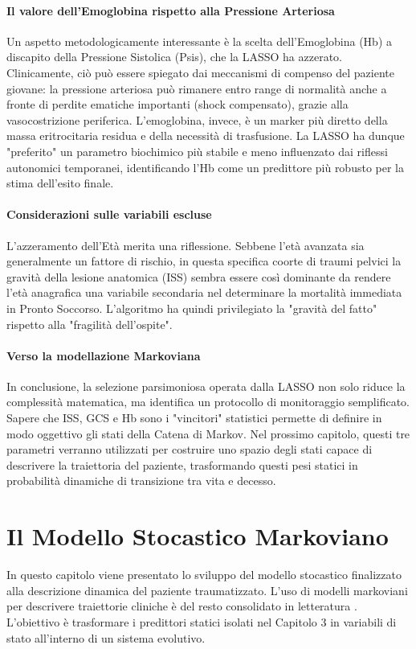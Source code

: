 \documentclass[11pt, oneside, noexaminfo]{sapthesis}   	%
\begin{document}
\subsubsection{Il valore dell'Emoglobina rispetto alla Pressione Arteriosa}
Un aspetto metodologicamente interessante è la scelta dell'Emoglobina (Hb) a discapito della Pressione Sistolica (Psis), che la LASSO ha azzerato. Clinicamente, ciò può essere spiegato dai meccanismi di compenso del paziente giovane: la pressione arteriosa può rimanere entro range di normalità anche a fronte di perdite ematiche importanti (shock compensato), grazie alla vasocostrizione periferica. L'emoglobina, invece, è un marker più diretto della massa eritrocitaria residua e della necessità di trasfusione. La LASSO ha dunque "preferito" un parametro biochimico più stabile e meno influenzato dai riflessi autonomici temporanei, identificando l'Hb come un predittore più robusto per la stima dell'esito finale.

\subsubsection{Considerazioni sulle variabili escluse}
L'azzeramento dell'Età merita una riflessione. Sebbene l'età avanzata sia generalmente un fattore di rischio, in questa specifica coorte di traumi pelvici la gravità della lesione anatomica (ISS) sembra essere così dominante da rendere l'età anagrafica una variabile secondaria nel determinare la mortalità immediata in Pronto Soccorso. L'algoritmo ha quindi privilegiato la "gravità del fatto" rispetto alla "fragilità dell'ospite".

\subsubsection{Verso la modellazione Markoviana}
In conclusione, la selezione parsimoniosa operata dalla LASSO non solo riduce la complessità matematica, ma identifica un protocollo di monitoraggio semplificato. Sapere che ISS, GCS e Hb sono i "vincitori" statistici permette di definire in modo oggettivo gli stati della Catena di Markov. Nel prossimo capitolo, questi tre parametri verranno utilizzati per costruire uno spazio degli stati capace di descrivere la traiettoria del paziente, trasformando questi pesi statici in probabilità dinamiche di transizione tra vita e decesso.


\chapter{Il Modello Stocastico Markoviano}
In questo capitolo viene presentato lo sviluppo del modello stocastico finalizzato alla descrizione dinamica del paziente traumatizzato. L'uso di modelli markoviani per descrivere traiettorie cliniche è del resto consolidato in letteratura \cite{sonnenberg1993markov}. L'obiettivo è trasformare i predittori statici isolati nel Capitolo 3 in variabili di stato all'interno di un sistema evolutivo.
\end{document}
